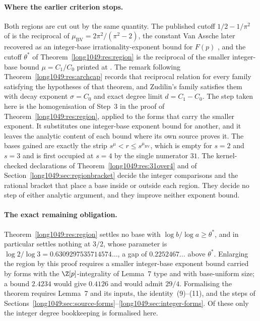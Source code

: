 \paragraph{Where the earlier criterion stops.}
Both regions are cut out by the same quantity.  The published cutoff
$1/2-1/\pi^{2}$ of \cite[Thm.~2, p.~177]{bv1994} is the reciprocal of
$\mu_{\mathrm{BV}}=2\pi^{2}/(\pi^{2}-2)$, the constant Van Assche later
recovered as an integer-base irrationality-exponent bound for $F(p)$
\cite[Thm.~1, p.~10]{vanassche2001}, and the cutoff $\theta^{*}$ of
Theorem~\ref{long1049:res:region} is the reciprocal of the smaller integer-base bound
$\mu=C_1/C_0$ printed at \cite[p.~162]{zudilin2004}.  The remark following
Theorem~\ref{long1049:res:archcap} records that reciprocal relation for every family
satisfying the hypotheses of that theorem, and Zudilin's family satisfies them
with decay exponent $\sigma=C_0$ and exact degree limit $d=C_1-C_0$.  The step
taken here is the homogenisation of Step~3 in the proof of
Theorem~\ref{long1049:res:region}, applied to the forms that carry the smaller exponent.
It substitutes one integer-base exponent bound for another, and it leaves the
analytic content of each bound where its own source proves it.  The bases
gained are exactly the strip $s^{\mu}<r\le s^{\mu_{\mathrm{BV}}}$, which is empty
for $s=2$ and $s=3$ and is first occupied at $s=4$ by the single numerator
$31$.  The kernel-checked declarations of Theorem~\ref{long1049:res:31over4} and of
Section~\ref{long1049:sec:regionbracket} decide the integer comparisons and the rational
bracket that place a base inside or outside each region.  They decide no step
of either analytic argument, and they improve neither exponent bound.

\paragraph{The exact remaining obligation.}
Theorem~\ref{long1049:res:region} settles no base with $\log b/\log a\ge\theta^{*}$, and
in particular settles nothing at $3/2$, whose parameter is
$\log2/\log3=0.6309297535714574\ldots$, a gap of $0.2252467\ldots$ above
$\theta^{*}$.  Enlarging the region by this proof requires a smaller integer-base
exponent bound carried by forms with the $\Z[p]$-integrality of Lemma~7 type and
with base-uniform size; a bound $2.4234$ would give $0.4126$ and would admit
$29/4$.  Formalising the theorem requires Lemma~7 and its inputs, the
identity~(9)--(11), and the steps of
Sections~\ref{long1049:sec:source-forms}--\ref{long1049:sec:integer-forms}.  Of these only the
integer degree bookkeeping is formalised here.

